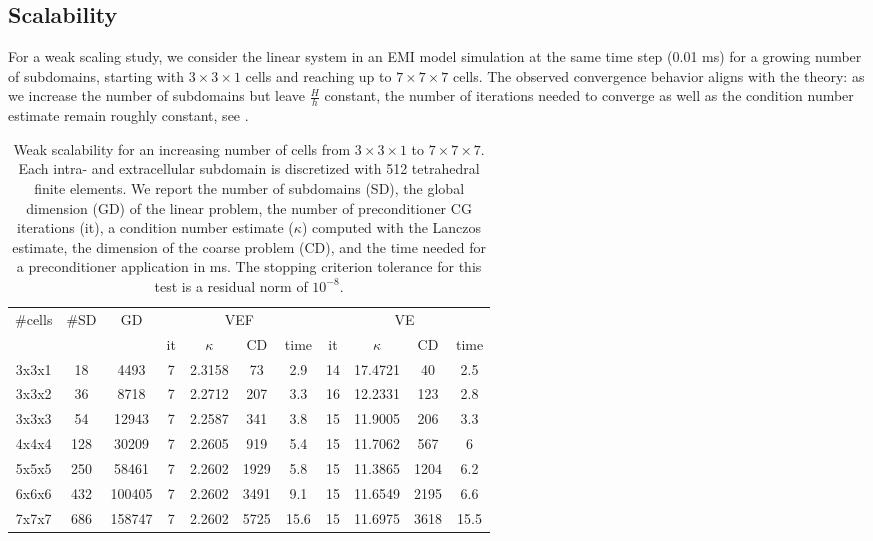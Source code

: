\subsection{Scalability}
For a weak scaling study, we consider the linear system in an EMI model simulation at the same time step (0.01 ms) for a growing number of subdomains, starting with $3\times 3\times 1$ cells and reaching up to $7\times 7\times 7$ cells. The observed convergence behavior aligns with the theory: as we increase the number of subdomains but leave $\frac{H}{h}$ constant, the number of iterations needed to converge as well as the condition number estimate remain roughly constant, see .

\begin{table}[h]
    \centering
    \begin{tabular}{ccccccccccc}
         \hline 
         \multirow{2}{1cm}{\#cells} & \multirow{2}{0.8cm}{\#SD} & \multirow{2}{1cm}{GD} & \multicolumn{4}{c}{VEF} & \multicolumn{4}{c}{VE} \\
         &&& it & $\kappa$ & CD & time & it & $\kappa$ & CD & time \\\hline
         3x3x1 & 18 & 4493 & 7 & 2.3158 & 73 & 2.9 & 14 & 17.4721 & 40 & 2.5\\
         3x3x2 & 36 & 8718 & 7 & 2.2712 & 207 & 3.3 & 16 & 12.2331 & 123 & 2.8\\
         3x3x3 & 54 & 12943 & 7 & 2.2587 & 341 & 3.8 & 15 & 11.9005 & 206 & 3.3\\
         4x4x4 & 128 & 30209 & 7 & 2.2605 & 919 & 5.4 & 15 & 11.7062 & 567 & 6\\
         5x5x5 & 250 & 58461 & 7 & 2.2602 & 1929 & 5.8 & 15 & 11.3865 & 1204 & 6.2\\
         6x6x6 & 432 & 100405 & 7 & 2.2602 & 3491 & 9.1 & 15 & 11.6549 & 2195 & 6.6\\
         7x7x7 & 686 & 158747 & 7 & 2.2602 & 5725 & 15.6 & 15 & 11.6975 & 3618 & 15.5 \\\hline
    \end{tabular}
    \caption{Weak scalability for an increasing number of cells from $3\times 3\times 1$ to $7\times 7\times 7$. Each intra- and extracellular subdomain is discretized with 512 tetrahedral finite elements. We report the number of subdomains (SD), the global dimension (GD) of the linear problem, the number of preconditioner CG iterations (it), a condition number estimate ($\kappa$) computed with the Lanczos estimate, the dimension of the coarse problem (CD), and the time needed for a preconditioner application in ms. The stopping criterion tolerance for this test is a residual norm of $10^{-8}$.}
    \label{tab:weak_scaling}
\end{table}

